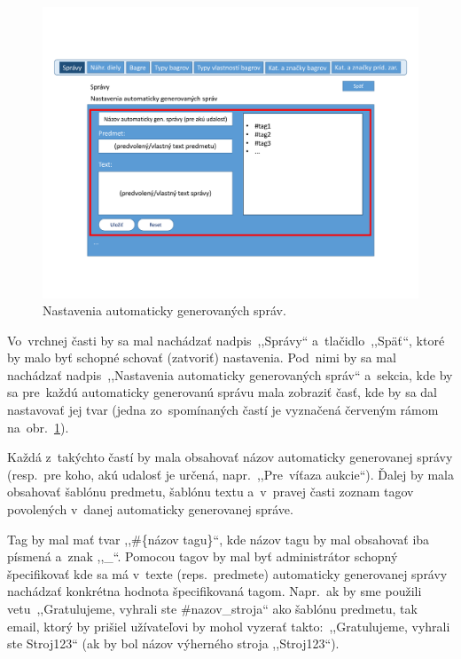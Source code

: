 \begin{figure}[H]\centering
\includegraphics[width=140mm]{../img/UI concept/messages settings}
\caption{Nastavenia automaticky generovaných správ.}
\label{messages settings}
\end{figure}

Vo~vrchnej časti by sa mal nachádzať nadpis~,,Správy`` a~tlačidlo~,,Späť``, ktoré by malo byť schopné schovať (zatvoriť) nastavenia. Pod~nimi by sa mal nachádzať nadpis~,,Nastavenia automaticky generovaných správ`` a~sekcia, kde by sa pre~každú automaticky generovanú správu mala zobraziť časť, kde by sa dal nastavovať jej tvar (jedna zo~spomínaných častí je vyznačená červeným rámom na~obr.~\ref{messages settings}).

Každá z~takýchto častí by mala obsahovať názov automaticky generovanej správy (resp.~pre koho, akú udalosť je určená, napr.~,,Pre~víťaza aukcie``). Ďalej by mala obsahovať šablónu predmetu, šablónu textu a~v~pravej časti zoznam tagov povolených v~danej automaticky generovanej správe.

Tag by mal mať tvar ,,\#\{názov tagu\}``, kde názov tagu by mal obsahovať iba písmená a~znak ,,\_``. Pomocou tagov by mal byť administrátor schopný špecifikovať kde sa má v~texte (reps.~predmete) automaticky generovanej správy nachádzať konkrétna hodnota špecifikovaná tagom. Napr.~ak by sme použili vetu~,,Gratulujeme, vyhrali ste \#nazov\_stroja`` ako šablónu predmetu, tak email, ktorý by prišiel užívateľovi by mohol vyzerať takto:~,,Gratulujeme, vyhrali ste Stroj123`` (ak by bol názov výherného stroja ,,Stroj123``).

